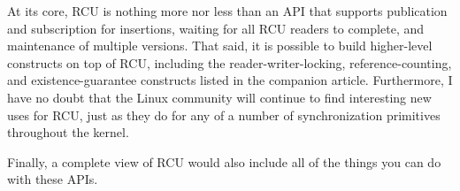 At its core, RCU is nothing more nor less than an API that supports
publication and subscription for insertions, waiting for all RCU readers
to complete, and maintenance of multiple versions.
That said, it is possible to build higher-level constructs
on top of RCU, including the reader-writer-locking, reference-counting,
and existence-guarantee constructs listed in the companion article.
Furthermore, I have no doubt that the Linux community will continue to
find interesting new uses for RCU,
just as they do for any of a number of synchronization
primitives throughout the kernel.

Finally, a complete view of RCU would also include
all of the things you can do with these APIs.


%
